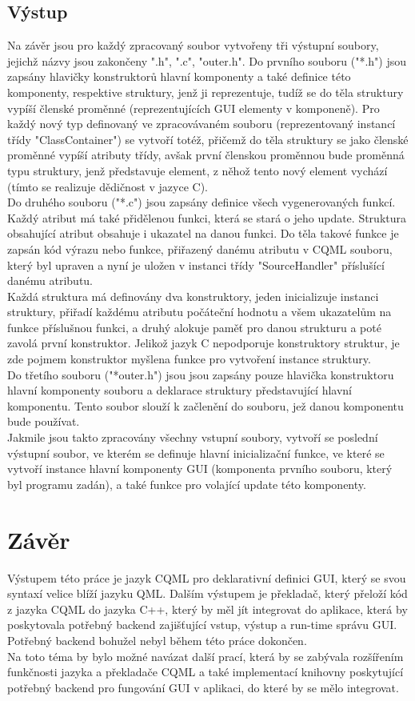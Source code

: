 \documentclass[report,11pt]{elsarticle}
\begin{document}
\subsection{Výstup}
Na závěr jsou pro každý zpracovaný soubor vytvořeny tři výstupní soubory, jejichž názvy jsou zakončeny ".h", ".c", "outer.h". 
Do prvního souboru ("*.h") jsou zapsány hlavičky konstruktorů hlavní komponenty a také definice této komponenty, respektive struktury, jenž ji reprezentuje, tudíž se do těla struktury vypíší členské proměnné (reprezentujících GUI elementy v komponeně). Pro každý nový typ definovaný ve zpracovávaném souboru (reprezentovaný instancí třídy "ClassContainer") se vytvoří totéž, přičemž do těla struktury se jako členské proměnné vypíší atributy třídy, avšak první členskou proměnnou bude proměnná typu struktury, jenž představuje element, z něhož tento nový element vychází (tímto se realizuje dědičnost v jazyce C).\\
Do druhého souboru ("*.c") jsou zapsány definice všech vygenerovaných funkcí. Každý atribut má také přidělenou funkci, která se stará o jeho update. Struktura obsahující atribut obsahuje i ukazatel na danou funkci. Do těla takové funkce je zapsán kód výrazu nebo funkce, přiřazený danému atributu v CQML souboru, který byl upraven a nyní je uložen v instanci třídy "SourceHandler" příslušící danému atributu.\\
Každá struktura má definovány dva konstruktory, jeden inicializuje instanci struktury, přiřadí každému atributu počáteční hodnotu a všem ukazatelům na funkce příslušnou funkci, a druhý alokuje paměť pro danou strukturu a poté zavolá první konstruktor. Jelikož jazyk C nepodporuje konstruktory struktur, je zde pojmem konstruktor myšlena funkce pro vytvoření instance struktury.\\
Do třetího souboru ("*outer.h") jsou jsou zapsány pouze hlavička konstruktoru hlavní komponenty souboru a deklarace struktury představující hlavní komponentu. Tento soubor slouží k začlenění do souboru, jež danou komponentu bude používat.\\
Jakmile jsou takto zpracovány všechny vstupní soubory, vytvoří se poslední výstupní soubor, ve kterém se definuje hlavní inicializační funkce, ve které se vytvoří instance hlavní komponenty GUI (komponenta prvního souboru, který byl programu zadán), a také funkce pro volající update této komponenty.\\


\section{\label{SEC:Conclusion}Závěr}
Výstupem této práce je jazyk CQML pro deklarativní definici GUI, který se svou syntaxí velice blíží jazyku QML. Dalším výstupem je překladač, který přeloží kód z jazyka CQML do jazyka C++, který by měl jít integrovat do aplikace, která by poskytovala potřebný backend zajišťující vstup, výstup a run-time správu GUI. Potřebný backend bohužel nebyl během této práce dokončen.\\
Na toto téma by bylo možné navázat další prací, která by se zabývala rozšířením funkčnosti jazyka a překladače CQML a také implementací knihovny poskytující potřebný backend pro fungování GUI v aplikaci, do které by se mělo integrovat.
\end{document}
